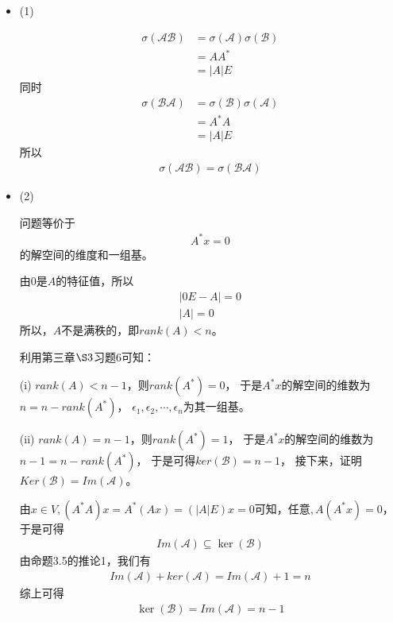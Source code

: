 \documentclass{article}
\begin{document}
\begin{itemize}
  \item (1)

        \begin{align*}
          \sigma(\mathscr{A}\mathscr{B})
           & = \sigma(\mathscr{A})\sigma(\mathscr{B}) \\
           & = A A^{*}                                \\
           & = |A| E
        \end{align*}
        同时
        \begin{align*}
          \sigma(\mathscr{B}\mathscr{A})
           & = \sigma(\mathscr{B}) \sigma(\mathscr{A}) \\
           & = A^{*} A                                 \\
           & = |A| E
        \end{align*}
        所以
        \begin{align*}
          \sigma(\mathscr{A}\mathscr{B}) = \sigma(\mathscr{B}\mathscr{A})
        \end{align*}

  \item (2)

        问题等价于
        \begin{align*}
          A^{*} x = 0
        \end{align*}
        的解空间的维度和一组基。

        由$0$是$A$的特征值，所以
        \begin{align*}
          |0 E - A| = 0 \\
          |A| = 0
        \end{align*}
        所以，$A$不是满秩的，即$rank(A) < n$。

        利用第三章$\S 3$习题6可知：

        (i) $rank(A) < n - 1$，则$rank(A^*) = 0$，
        于是$A^{*} x$的解空间的维数为$n = n - rank(A^*)$，
        $\epsilon_1, \epsilon_2, \cdots, \epsilon_n$为其一组基。

        (ii) $rank(A) = n - 1$，则$rank(A^*) = 1$，
        于是$A^{*} x$的解空间的维数为$n - 1 = n - rank(A^*)$，
        于是可得$ker(\mathscr{B}) = n - 1$，
        接下来，证明$Ker(\mathscr{B}) = Im(\mathscr{A})$。

        由$x \in V, (A^* A)x = A^* (Ax) = (|A| E)x = 0 $可知，任意$, A(A^* x) = 0$，
        于是可得
        \begin{align*}
          Im(\mathscr{A}) \subseteq \ker(\mathscr{B})
        \end{align*}
        由命题3.5的推论1，我们有
        \begin{align*}
          Im(\mathscr{A}) + ker(\mathscr{A}) = Im(\mathscr{A}) + 1 = n
        \end{align*}
        综上可得
        \begin{align*}
          \ker(\mathscr{B}) = Im(\mathscr{A}) = n - 1
        \end{align*}
\end{itemize}
\end{document}

